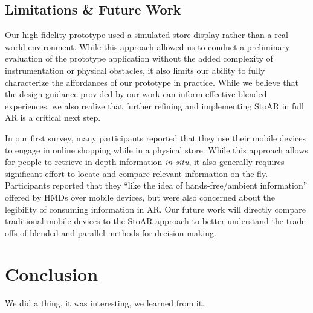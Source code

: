 \subsection{Limitations \& Future Work}
Our high fidelity prototype used a simulated store display rather than a real world environment.  While this approach allowed us to conduct a preliminary evaluation of the prototype application without the added complexity of instrumentation or physical obstacles, it also limits our ability to fully characterize the affordances of our prototype in practice.  
While we believe that the design guidance provided by our work can inform effective blended experiences, we also realize that further refining and implementing StoAR in full AR is a critical next step. 

In our first survey, many participants reported that they use their mobile devices to engage in online shopping while in a physical store. While this approach allows for people to retrieve in-depth information \emph{in situ}, it also generally requires significant effort to locate and compare relevant information on the fly. Participants reported that they ``like the idea of hands-free/ambient information'' offered by HMDs over mobile devices, but were also concerned about the legibility of consuming information in AR. Our future work will directly compare traditional mobile devices to the StoAR approach to better understand the trade-offs of blended and parallel methods for decision making. 

\section{Conclusion}
We did a thing, it was interesting, we learned from it.